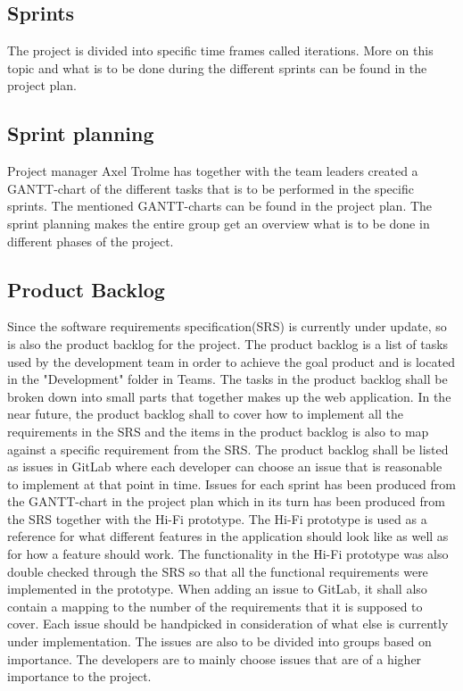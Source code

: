 \subsection{Sprints}
The project is divided into specific time frames called iterations. More on this topic and what is to be done during the different sprints can be found in the project plan. 

\subsection{Sprint planning}
Project manager Axel Trolme has together with the team leaders created a GANTT-chart of the different tasks that is to be performed in the specific sprints. The mentioned GANTT-charts can be found in the project plan. The sprint planning makes the entire group get an overview what is to be done in different phases of the project. 

\subsection{Product Backlog}
Since the software requirements specification(SRS) is currently under update, so is also the product backlog for the project. The product backlog is a list of tasks used by the development team in order to achieve the goal product and is located in the "Development" folder in Teams. The tasks in the product backlog shall be broken down into small parts that together makes up the web application. In the near future, the product backlog shall to cover how to implement all the requirements in the SRS and the items in the product backlog is also to map against a specific requirement from the SRS. The product backlog shall be listed as issues in GitLab where each developer can choose an issue that is reasonable to implement at that point in time. Issues for each sprint has been produced from the GANTT-chart in the project plan which in its turn has been produced from the SRS together with the Hi-Fi prototype. The Hi-Fi prototype is used as a reference for what different features in the application should look like as well as for how a feature should work. The functionality in the Hi-Fi prototype was also double checked through the SRS so that all the functional requirements were implemented in the prototype.  When adding an issue to GitLab, it shall also contain a mapping to the number of the requirements that it is supposed to cover. Each issue should be handpicked in consideration of what else is currently under implementation. The issues are also to be divided into groups based on importance. The developers are to mainly choose issues that are of a higher importance to the project.  

